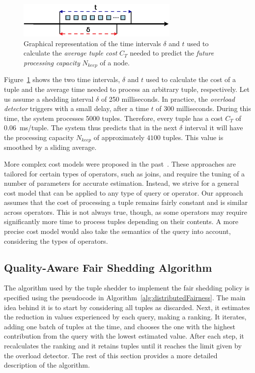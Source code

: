 \begin{figure}  
	\centering
	\includegraphics[width=0.7\textwidth]{img/tesi/tuple_cost} 
	\caption{Graphical representation of the time intervals $\delta$ and $t$ used to calculate the
	\emph{average tuple cost} $C_T$ needed to predict the \emph{future processing capacity}
	$N_{keep}$ of a node.}
	\label{fig:tuple_cost}
\end{figure} 

Figure~\ref{fig:tuple_cost} shows the two time intervals, $\delta$ and $t$ used to calculate the cost of
a tuple and the average time needed to process an arbitrary tuple, respectively. Let us assume a shedding
interval $\delta$ of 250 milliseconds. In practice, the \emph{overload detector} triggers with a small
delay, \eg after a time $t$ of 300 milliseconds. During this time, the system processes 5000 tuples.
Therefore, every tuple has a cost $C_T$ of $0.06$~ms/tuple. The system thus predicts that in the next $\delta$ interval it will
have the processing capacity $N_{keep}$ of approximately  $4100$ tuples. This value is
smoothed by a sliding average.

More complex cost models were proposed in the past~\cite{expensivepredicatejoin07,
evaluatingwindow03}. These approaches are tailored for certain types of operators, such as joins, and
require the tuning of a number of parameters for accurate estimation. Instead, we strive for a general
cost model that can be applied to any type of query or operator. Our approach assumes that the cost of processing a tuple
remains fairly constant and is similar across operators. This is not always true, though, as some
operators may require significantly more time to process tuples depending on their contents. A
more precise cost model would also take the semantics of the query into account, \eg considering the
types of operators. 

\subsection*{Quality-Aware Fair Shedding Algorithm}
\label{sec:fairness-algo}

The algorithm used by the tuple shedder to implement the fair shedding policy is specified using the
pseudocode in Algorithm~\ref{alg:distributedFairness}. The main idea behind it is to start by considering
all tuples as discarded. Next, it estimates the reduction in \sic values experienced by each query,
making a ranking. It iterates, adding one batch of tuples at the time, and chooses the one with the
highest \sic contribution from the query with the lowest estimated \sic value. After each step, it
recalculates the ranking and it retains tuples until it reaches the limit given by the overload
detector. The rest of this section provides a more detailed description of the algorithm.


